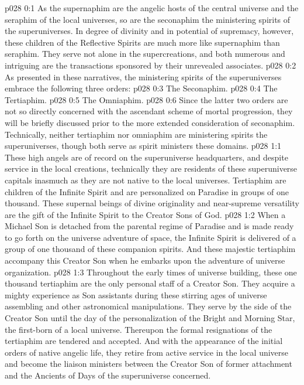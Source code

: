 \author{Mighty Messenger}
\vs p028 0:1 As the supernaphim are the angelic hosts of the central universe and the seraphim of the local universes, so are the seconaphim the ministering spirits of the superuniverses. In degree of divinity and in potential of supremacy, however, these children of the Reflective Spirits are much more like supernaphim than seraphim. They serve not alone in the supercreations, and both numerous and intriguing are the transactions sponsored by their unrevealed associates.
\pc \vs p028 0:2 As presented in these narratives, the ministering spirits of the superuniverses embrace the following three orders:
\pc \vs p028 0:3 \bibnobreakspace The Seconaphim.
\vs p028 0:4 \bibnobreakspace The Tertiaphim.
\vs p028 0:5 \bibnobreakspace The Omniaphim.
\pc \vs p028 0:6 Since the latter two orders are not so directly concerned with the ascendant scheme of mortal progression, they will be briefly discussed prior to the more extended consideration of seconaphim. Technically, neither tertiaphim nor omniaphim are ministering spirits  the superuniverses, though both serve as spirit ministers  these domains.
\vs p028 1:1 These high angels are of record on the superuniverse headquarters, and despite service in the local creations, technically they are residents of these superuniverse capitals inasmuch as they are not native to the local universes. Tertiaphim are children of the Infinite Spirit and are personalized on Paradise in groups of one thousand. These supernal beings of divine originality and near\hyp{}supreme versatility are the gift of the Infinite Spirit to the Creator Sons of God.
\vs p028 1:2 When a Michael Son is detached from the parental regime of Paradise and is made ready to go forth on the universe adventure of space, the Infinite Spirit is delivered of a group of one thousand of these companion spirits. And these majestic tertiaphim accompany this Creator Son when he embarks upon the adventure of universe organization.
\vs p028 1:3 Throughout the early times of universe building, these one thousand tertiaphim are the only personal staff of a Creator Son. They acquire a mighty experience as Son assistants during these stirring ages of universe assembling and other astronomical manipulations. They serve by the side of the Creator Son until the day of the personalization of the Bright and Morning Star, the first\hyp{}born of a local universe. Thereupon the formal resignations of the tertiaphim are tendered and accepted. And with the appearance of the initial orders of native angelic life, they retire from active service in the local universe and become the liaison ministers between the Creator Son of former attachment and the Ancients of Days of the superuniverse concerned.
